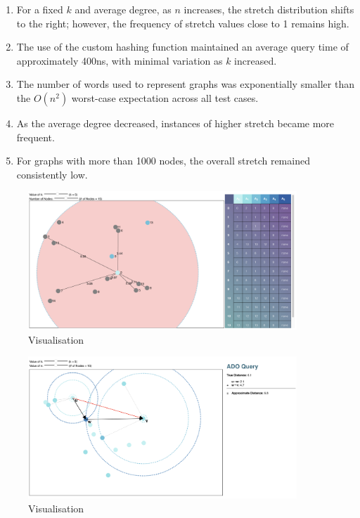 \documentclass{article}
\begin{document}
\begin{enumerate}
    \item For a fixed $k$ and average degree, as $n$ increases, the stretch distribution shifts to the right; however, the frequency of stretch values close to 1 remains high.

    \item The use of the custom hashing function maintained an average query time of approximately 400ns, with minimal variation as $k$ increased.

    \item The number of words used to represent graphs was exponentially smaller than the $O(n^2)$ worst-case expectation across all test cases.

    \item As the average degree decreased, instances of higher stretch became more frequent.

    \item For graphs with more than 1000 nodes, the overall stretch remained consistently low.
\end{enumerate}

\begin{figure}
\begin{center}
    \includegraphics[width=0.9\textwidth]{img/v1.png}
    \caption{Visualisation}
    \label{fig:visualisation1}
\end{center}
\end{figure}

\begin{figure}
\begin{center}
    \includegraphics[width=0.9\textwidth]{img/v2.png}
    \caption{Visualisation}
    \label{fig:visualisation2}
\end{center}
\end{figure}
\end{document}
